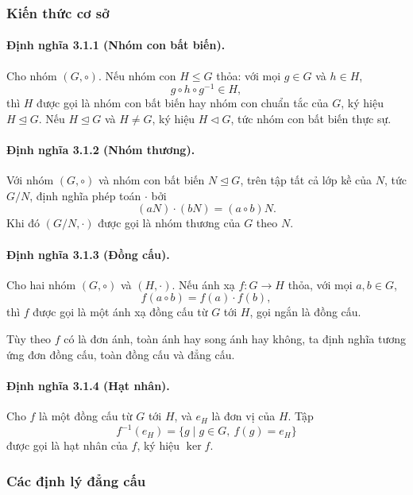 \documentclass[11pt]{article}
\begin{document}
\subsubsection{Kiến thức cơ sở}

\paragraph{Định nghĩa 3.1.1 (Nhóm con bất biến).}
Cho nhóm \((G,\circ)\). Nếu nhóm con \(H\le G\) thỏa: với mọi \(g\in G\) và
\(h\in H\),
\[
  g\circ h\circ g^{-1}\in H,
\]
thì \(H\) được gọi là nhóm con bất biến hay nhóm con chuẩn tắc của \(G\), ký
hiệu \(H\trianglelefteq G\). Nếu \(H\trianglelefteq G\) và \(H\ne G\), ký hiệu
\(H\triangleleft G\), tức nhóm con bất biến thực sự.

\paragraph{Định nghĩa 3.1.2 (Nhóm thương).}
Với nhóm \((G,\circ)\) và nhóm con bất biến \(N\trianglelefteq G\), trên tập
tất cả lớp kề của \(N\), tức \(G/N\), định nghĩa phép toán \(\cdot\) bởi
\[
  (aN)\cdot(bN)=(a\circ b)N.
\]
Khi đó \((G/N,\cdot)\) được gọi là nhóm thương của \(G\) theo \(N\).

\paragraph{Định nghĩa 3.1.3 (Đồng cấu).}
Cho hai nhóm \((G,\circ)\) và \((H,\cdot)\). Nếu ánh xạ \(f:G\to H\) thỏa, với
mọi \(a,b\in G\),
\[
  f(a\circ b)=f(a)\cdot f(b),
\]
thì \(f\) được gọi là một ánh xạ đồng cấu từ \(G\) tới \(H\), gọi ngắn là đồng
cấu.

Tùy theo \(f\) có là đơn ánh, toàn ánh hay song ánh hay không, ta định nghĩa
tương ứng đơn đồng cấu, toàn đồng cấu và đẳng cấu.

\paragraph{Định nghĩa 3.1.4 (Hạt nhân).}
Cho \(f\) là một đồng cấu từ \(G\) tới \(H\), và \(e_H\) là đơn vị của \(H\).
Tập
\[
  f^{-1}(e_H)=\{g\mid g\in G,\ f(g)=e_H\}
\]
được gọi là hạt nhân của \(f\), ký hiệu \(\ker f\).

\subsubsection{Các định lý đẳng cấu}
\end{document}

